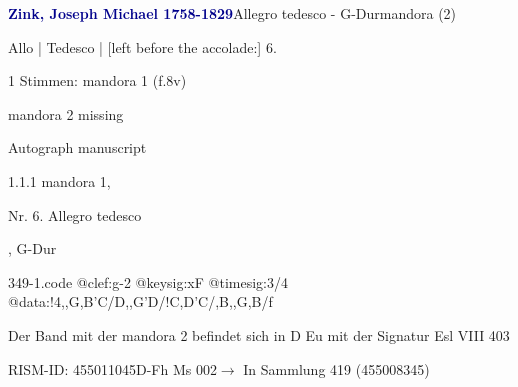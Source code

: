 \documentclass[twocolumn]{book}
\begin{document}
\par \vspace{7pt} \textcolor{darkblue}{\textbf{Zink, Joseph Michael  1758-1829}}\hfillplus{\textbf{[349]}}\newline Allegro tedesco - G-Dur\newline mandora (2)
\par \begin{itshape}[f.8v, at left:] Allo | Tedesco | [left before the accolade:] 6.\end{itshape} 
\par \textcolor{darkblue}{}  1 Stimmen: mandora 1  (f.8v)\newline \begin{small} mandora 2 missing\end{small} \newline Autograph manuscript
\par 1.1.1  mandora 1, \begin{itshape}Nr. 6. Allegro tedesco\end{itshape}, G-Dur  
\begin{filecontents*}{349-1.code}
@clef:g-2
@keysig:xF
@timesig:3/4
@data:!4,,G,B'C/D,,G'D/!C,D'C/,B,,G,B/f
\end{filecontents*}
\newline
%
\par Der Band mit der mandora 2 befindet sich in D Eu mit der Signatur Esl VIII 403
\par RISM-ID: 455011045\newline D-Fh  Ms 002\newline $\rightarrow$ In Sammlung 419 (455008345)
      
\end{document}
